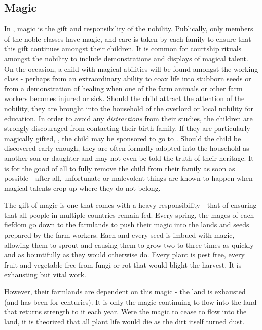 \documentclass[blue]{GL2020}
\begin{document}
\subsection*{Magic}

In \pFarm{}, magic is the gift and responsibility of the nobility. Publically, only members of the noble classes have magic, and care is taken by each family to ensure that this gift continues amongst their children.  It is common for courtship rituals amongst the nobility to include demonstrations and displays of magical talent.  On the occasion, a child with magical abilities will be found amongst the working class - perhaps from an extraordinary ability to coax life into stubborn seeds or from a demonstration of healing when one of the farm animals or other farm workers becomes injured or sick.  Should the child attract the attention of the nobility, they are brought into the household of the overlord or local nobility for education. In order to avoid any \emph{distractions} from their studies, the children are strongly discouraged from contacting their birth family.  If they are particularly magically gifted, , the child may be sponsored to go to \pSchool{}.  Should the child be discovered early enough, they are often formally adopted into the household as another son or daughter and may not even be told the truth of their heritage.  It is for the good of all to fully remove the child from their family as soon as possible - after all, unfortunate or malevolent things are known to happen when magical talents crop up where they do not belong.  

The gift of magic is one that comes with a heavy responsibility - that of ensuring that all people in multiple countries remain fed.  Every spring, the mages of each fiefdom go down to the farmlands to push their magic into the lands and seeds prepared by the farm workers.  Each and every seed is imbued with magic, allowing them to sprout and causing them to grow two to three times as quickly and as bountifully as they would otherwise do.  Every plant is pest free, every fruit and vegetable free from fungi or rot that would blight the harvest.  It is exhausting but vital work.

However, their farmlands are dependent on this magic - the land is exhausted (and has been for centuries). It is only the magic continuing to flow into the land that returns strength to it each year. Were the magic to cease to flow into the land, it is theorized that all plant life would die as the dirt itself turned dust.
\end{document}
